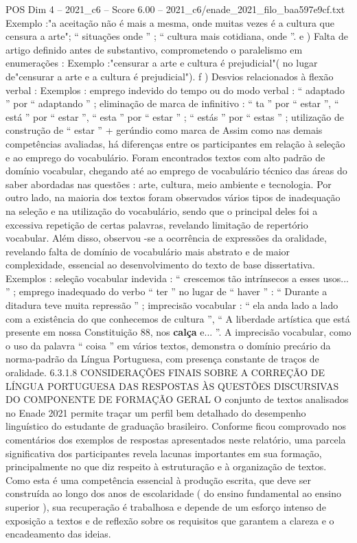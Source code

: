 \begin{textsample}{POS Dim 4 – 2021\_c6 – Score 6.00 – 2021\_c6/enade\_2021\_filo\_baa597e9cf.txt}
Exemplo :"a aceitação não é mais a mesma, onde muitas vezes é a cultura que censura a arte"; “ situações onde ” ; “ cultura mais cotidiana, onde ”. e ) Falta de artigo definido antes de substantivo, comprometendo o paralelismo em enumerações : Exemplo :"censurar a arte e cultura é prejudicial"( no lugar de"censurar a arte e a cultura é prejudicial"). f ) Desvios relacionados à flexão verbal : Exemplos : emprego indevido do tempo ou do modo verbal : “ adaptado ” por “ adaptando ” ; eliminação de marca de infinitivo : “ ta ” por “ estar ”, “ está ” por “ estar ”, “ esta ” por “ estar ” ; “ estás ” por “ estas ” ; utilização de construção de “ estar ” + gerúndio como marca de Assim como nas demais competências avaliadas, há diferenças entre os participantes em relação à seleção e ao emprego do vocabulário.
Foram encontrados textos com alto padrão de domínio vocabular, chegando até ao emprego de vocabulário técnico das áreas do saber abordadas nas questões : arte, cultura, meio ambiente e tecnologia.
Por outro lado, na maioria dos textos foram observados vários tipos de inadequação na seleção e na utilização do vocabulário, sendo que o principal deles foi a excessiva repetição de certas palavras, revelando limitação de repertório vocabular.
Além disso, observou -se a ocorrência de expressões da oralidade, revelando falta de domínio de vocabulário mais abstrato e de maior complexidade, essencial ao desenvolvimento do texto de base dissertativa.
Exemplos : seleção vocabular indevida : “ crescemos tão intrínsecos a esses usos... ” ; emprego inadequado do verbo “ ter ” no lugar de “ haver ” : “ Durante a ditadura teve muita repressão ” ; imprecisão vocabular : “ ela anda lado a lado com a existência do que conhecemos de cultura ”, “ A liberdade artística que está presente em nossa Constituição 88, nos \textbf{calça} e... ”.
A imprecisão vocabular, como o uso da palavra “ coisa ” em vários textos, demonstra o domínio precário da norma-padrão da Língua Portuguesa, com presença constante de traços de oralidade. 6.3.1.8 CONSIDERAÇÕES FINAIS SOBRE A CORREÇÃO DE LÍNGUA PORTUGUESA DAS RESPOSTAS ÀS QUESTÕES DISCURSIVAS DO COMPONENTE DE FORMAÇÃO GERAL O conjunto de textos analisados no Enade 2021 permite traçar um perfil bem detalhado do desempenho linguístico do estudante de graduação brasileiro.
Conforme ficou comprovado nos comentários dos exemplos de respostas apresentados neste relatório, uma parcela significativa dos participantes revela lacunas importantes em sua formação, principalmente no que diz respeito à estruturação e à organização de textos.
Como esta é uma competência essencial à produção escrita, que deve ser construída ao longo dos anos de escolaridade ( do ensino fundamental ao ensino superior ), sua recuperação é trabalhosa e depende de um esforço intenso de exposição a textos e de reflexão sobre os requisitos que garantem a clareza e o encadeamento das ideias.

\end{textsample}
